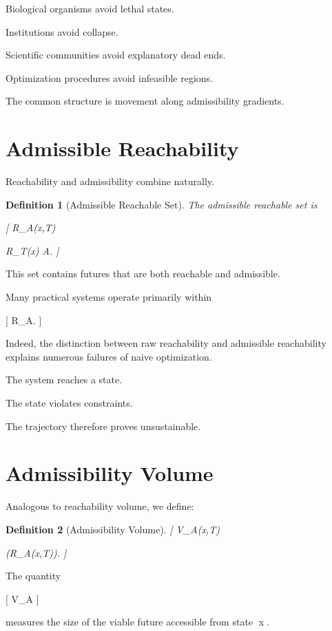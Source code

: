 \documentclass[11pt,oneside,openany]{book}
\newtheorem{definition}{Definition}[chapter] \newtheorem{theorem}{Theorem}[chapter] \newtheorem{proposition}{Proposition}[chapter] \newtheorem{lemma}{Lemma}[chapter] \newtheorem{corollary}{Corollary}[chapter] \newtheorem{remark}{Remark}[chapter]
\begin{document}
Biological organisms avoid lethal states.

Institutions avoid collapse.

Scientific communities avoid explanatory dead ends.

Optimization procedures avoid infeasible regions.

The common structure is movement along admissibility gradients.

\section{Admissible Reachability}

Reachability and admissibility combine naturally.

\begin{definition}[Admissible Reachable Set]

The admissible reachable set is

[
R_A(x,T)

R_T(x)
\cap
\mathcal A.
]

\end{definition}

This set contains futures that are both reachable and admissible.

Many practical systems operate primarily within

[
R_A.
]

Indeed, the distinction between raw reachability and admissible reachability explains numerous failures of naive optimization.

The system reaches a state.

The state violates constraints.

The trajectory therefore proves unsustainable.

\section{Admissibility Volume}

Analogous to reachability volume, we define:

\begin{definition}[Admissibility Volume]

[
V_A(x,T)

\mu(R_A(x,T)).
]

\end{definition}

The quantity

[
V_A
]

measures the size of the viable future accessible from state x.
\end{document}
